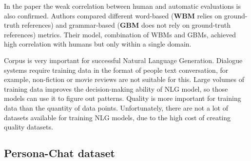 In the paper \cite{novikova2017we} the weak correlation between human and automatic evaluations is also confirmed. Authors compared different word-based (\textbf{WBM} relies on ground-truth references) and grammar-based (\textbf{GBM} does not rely on ground-truth references) metrics. Their model, combination of WBMs and GBMs, achieved high correlation with humans but only within a single domain.

Corpus is very important for successful Natural Language Generation. Dialogue systems require training data in the format of people text conversation, for example, non-fiction or movie reviews are not suitable for this. Large volumes of training data improves the decision-making ability of NLG model, so those models can use it to figure out patterns. Quality is more important for training data than the quantity of data points. Unfortunately, there are not a lot of datasets available for training NLG models, due to the high cost of creating quality datasets.  

\subsection{Persona-Chat dataset} \label{persona_chat_subsec}

